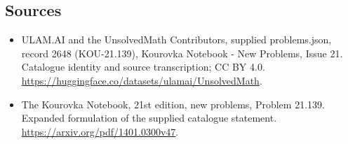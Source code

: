 \documentclass[11pt,a4paper]{article}
\begin{document}
\subsection{Sources}
\begin{itemize}
\item[S1] ULAM.AI and the UnsolvedMath Contributors, supplied problems.json, record 2648 (KOU-21.139), Kourovka Notebook - New Problems, Issue 21. Catalogue identity and source transcription; CC BY 4.0.
\url{https://huggingface.co/datasets/ulamai/UnsolvedMath}.
\item[S2] The Kourovka Notebook, 21st edition, new problems, Problem 21.139. Expanded formulation of the supplied catalogue statement.
\url{https://arxiv.org/pdf/1401.0300v47}.
\end{itemize}
\end{document}
